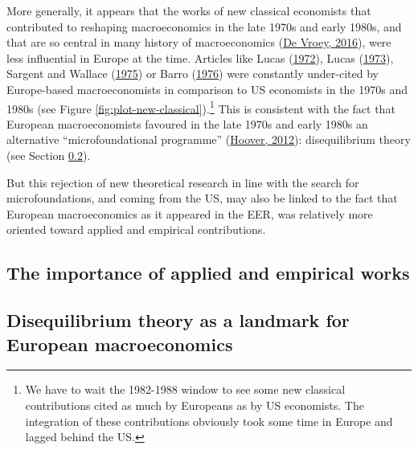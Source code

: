 \documentclass[
  12pt,
  onecolumn]{article}
\begin{document}
More generally, it appears that the works of new classical economists
that contributed to reshaping macroeconomics in the late 1970s and early
1980s, and that are so central in many history of macroeconomics
(\protect\hyperlink{ref-devroey2016}{De Vroey, 2016}), were less
influential in Europe at the time. Articles like Lucas
(\protect\hyperlink{ref-lucas1972}{1972}), Lucas
(\protect\hyperlink{ref-lucas1973}{1973}), Sargent and Wallace
(\protect\hyperlink{ref-sargent1975}{1975}) or Barro
(\protect\hyperlink{ref-barro1976}{1976}) were constantly under-cited by
Europe-based macroeconomists in comparison to US economists in the 1970s
and 1980s (see Figure \ref{fig:plot-new-classical}).\footnote{We have to
  wait the 1982-1988 window to see some new classical contributions
  cited as much by Europeans as by US economists. The integration of
  these contributions obviously took some time in Europe and lagged
  behind the US.} This is consistent with the fact that European
macroeconomists favoured in the late 1970s and early 1980s an
alternative ``microfoundational programme''
(\protect\hyperlink{ref-hoover2012}{Hoover, 2012}): disequilibrium
theory (see Section \ref{disequilibrium}).

But this rejection of new theoretical research in line with the search
for microfoundations, and coming from the US, may also be linked to the
fact that European macroeconomics as it appeared in the EER, was
relatively more oriented toward applied and empirical contributions.

\hypertarget{the-importance-of-applied-and-empirical-works}{%
\subsection{The importance of applied and empirical
works}\label{the-importance-of-applied-and-empirical-works}}

\hypertarget{disequilibrium}{%
\subsection{Disequilibrium theory as a landmark for European
macroeconomics}\label{disequilibrium}}
\end{document}
